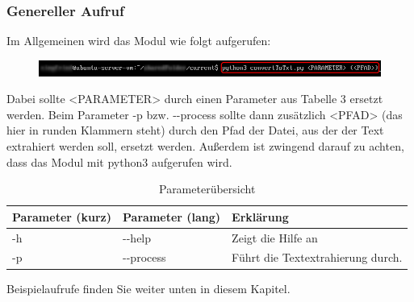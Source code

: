 \documentclass[12pt]{scrartcl}
\begin{document}
\subsubsection{Genereller Aufruf}
\label{sec:first-steps-general}
Im Allgemeinen wird das Modul wie folgt aufgerufen:
\begin{figure}[htbp]
\includegraphics[width=1.0\textwidth]{ersteSchritte001}\par\vspace{0.25cm}
\label{fig:ersteSchritteGeneral001}
\end{figure}
\newline
Dabei sollte <PARAMETER> durch einen Parameter aus Tabelle 3 ersetzt werden. Beim Parameter -p bzw. -{}-process sollte dann zusätzlich <PFAD> (das hier in runden Klammern steht) durch den Pfad der Datei, aus der der Text extrahiert werden soll, ersetzt werden. 
Außerdem ist zwingend darauf zu achten, dass das Modul mit python3 aufgerufen wird.
\begin{table}[H]
\begin{center}
\label{params}
\begin{tabular}{|l|l|l|}
\hline
\rowcolor[HTML]{C0C0C0} 
Parameter (kurz) & Parameter (lang) & Erklärung                                                                                                                              \\ \hline
-h               & -{}-help           & Zeigt die Hilfe an                                                                                                                     \\ \hline
-p               & -{}-process        & Führt die Textextrahierung durch.  \\ \hline
\end{tabular}
\caption{Parameterübersicht}
\end{center}
\end{table}

Beispielaufrufe finden Sie weiter unten in diesem Kapitel. 
\newpage
\end{document}
